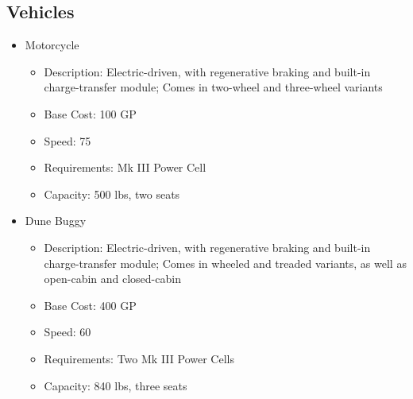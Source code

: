 \documentclass[12pt, landscape]{article}
\begin{document}
\begin{FlushLeft}
\begin{multicols}{2}
			\subsection{Vehicles}
			\begin{itemize}
				\item Motorcycle
				\begin{itemize}
					\item Description: Electric-driven, with regenerative braking and built-in charge-transfer module; Comes in two-wheel and three-wheel variants
					\item Base Cost: 100 GP
					\item Speed: 75
					\item Requirements: Mk III Power Cell
					\item Capacity: 500 lbs, two seats
				\end{itemize}
				\item Dune Buggy
				\begin{itemize}
					\item Description: Electric-driven, with regenerative braking and built-in charge-transfer module; Comes in wheeled and treaded variants, as well as open-cabin and closed-cabin
					\item Base Cost: 400 GP
					\item Speed: 60
					\item Requirements: Two Mk III Power Cells
					\item Capacity: 840 lbs, three seats
				\end{itemize}
			\end{itemize}
			\vfill \null \columnbreak


\end{multicols}
\end{FlushLeft}
\end{document}
